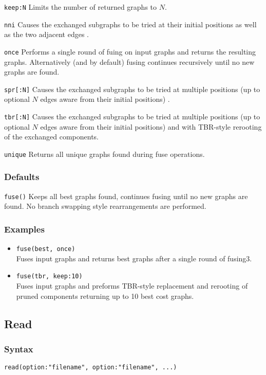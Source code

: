 \documentclass[11pt]{article}
\begin{document}
		\smallskip		
		\noindent \texttt{keep:N} Limits the number of returned graphs to $N$.  
		
		\smallskip		
		\noindent \texttt{nni} Causes the exchanged subgraphs to be tried at their initial positions  as well as the two adjacent edges .
		
		\smallskip		
		\noindent \texttt{once} Performs a single round of fuing on input graphs and returns the resulting graphs. Alternatively (and by default) fusing continues recursively until  no new graphs are found.
		
		\smallskip		
		\noindent \texttt{spr[:N]} Causes the exchanged subgraphs to be tried at multiple positions (up to optional $N$ edges aware from their initial positions) .
		
		\smallskip		
		\noindent \texttt{tbr[:N]} Causes the exchanged subgraphs to be tried at multiple positions (up to optional $N$ edges aware from their initial positions) and with TBR-style 
		rerooting of the exchanged components.
		
		\smallskip		
		\noindent \texttt{unique} Returns all unique graphs found during fuse operations.		
	
		\subsubsection{Defaults}
			\texttt{fuse()} Keeps all best graphs found, continues fusing until no new graphs are found. No branch swapping style rearrangements are performed.
		\subsubsection{Examples}
		\begin{itemize}
			\item{\texttt{fuse(best, once)}\\Fuses input graphs and returns best graphs after a single round of fusing3.}
			\item{\texttt{fuse(tbr, keep:10)} \\Fuses input graphs and preforms TBR-style replacement and rerooting of pruned components returning up to 10 best cost graphs.}
		\end{itemize}
	
	\subsection{Read}
		\subsubsection{Syntax}
				\texttt{read(option:"filename", option:"filename", ...)}
			
\end{document}
